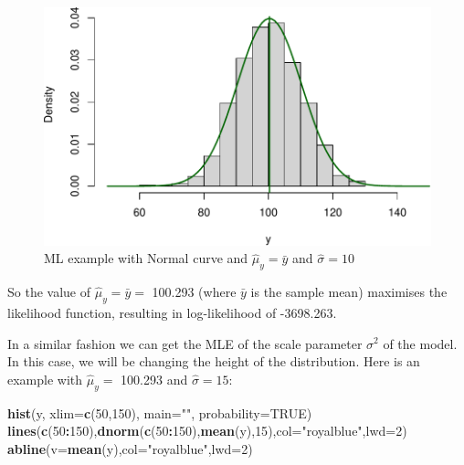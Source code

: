 \documentclass[
]{book}
\newenvironment{Shaded}{\begin{snugshade}}{\end{snugshade}}
\newcommand{\AttributeTok}[1]{\textcolor[rgb]{0.13,0.29,0.53}{#1}}
\newcommand{\ConstantTok}[1]{\textcolor[rgb]{0.56,0.35,0.01}{#1}}
\newcommand{\DecValTok}[1]{\textcolor[rgb]{0.00,0.00,0.81}{#1}}
\newcommand{\FunctionTok}[1]{\textcolor[rgb]{0.13,0.29,0.53}{\textbf{#1}}}
\newcommand{\NormalTok}[1]{#1}
\newcommand{\SpecialCharTok}[1]{\textcolor[rgb]{0.81,0.36,0.00}{\textbf{#1}}}
\newcommand{\StringTok}[1]{\textcolor[rgb]{0.31,0.60,0.02}{#1}}
\theoremstyle{definition}
\theoremstyle{definition}
\theoremstyle{definition}
\theoremstyle{definition}
\theoremstyle{remark}
\begin{document}
\begin{figure}
\centering
\includegraphics{Svetunkov---Statistics-for-Business-Analytics_files/figure-latex/MLENormalExample04-1.pdf}
\caption{\label{fig:MLENormalExample04}ML example with Normal curve and \(\hat{\mu}_y=\bar{y}\) and \(\hat{\sigma}=10\)}
\end{figure}

So the value of \(\hat{\mu}_y=\bar{y}=\) 100.293 (where \(\bar{y}\) is the sample mean) maximises the likelihood function, resulting in log-likelihood of -3698.263.

In a similar fashion we can get the MLE of the scale parameter \(\sigma^2\) of the model. In this case, we will be changing the height of the distribution. Here is an example with \(\hat{\mu}_y=\) 100.293 and \(\hat{\sigma}=15\):

\begin{Shaded}
\begin{Highlighting}[]
\FunctionTok{hist}\NormalTok{(y, }\AttributeTok{xlim=}\FunctionTok{c}\NormalTok{(}\DecValTok{50}\NormalTok{,}\DecValTok{150}\NormalTok{), }\AttributeTok{main=}\StringTok{""}\NormalTok{, }\AttributeTok{probability=}\ConstantTok{TRUE}\NormalTok{)}
\FunctionTok{lines}\NormalTok{(}\FunctionTok{c}\NormalTok{(}\DecValTok{50}\SpecialCharTok{:}\DecValTok{150}\NormalTok{),}\FunctionTok{dnorm}\NormalTok{(}\FunctionTok{c}\NormalTok{(}\DecValTok{50}\SpecialCharTok{:}\DecValTok{150}\NormalTok{),}\FunctionTok{mean}\NormalTok{(y),}\DecValTok{15}\NormalTok{),}\AttributeTok{col=}\StringTok{"royalblue"}\NormalTok{,}\AttributeTok{lwd=}\DecValTok{2}\NormalTok{)}
\FunctionTok{abline}\NormalTok{(}\AttributeTok{v=}\FunctionTok{mean}\NormalTok{(y),}\AttributeTok{col=}\StringTok{"royalblue"}\NormalTok{,}\AttributeTok{lwd=}\DecValTok{2}\NormalTok{)}
\end{Highlighting}
\end{Shaded}
\end{document}
